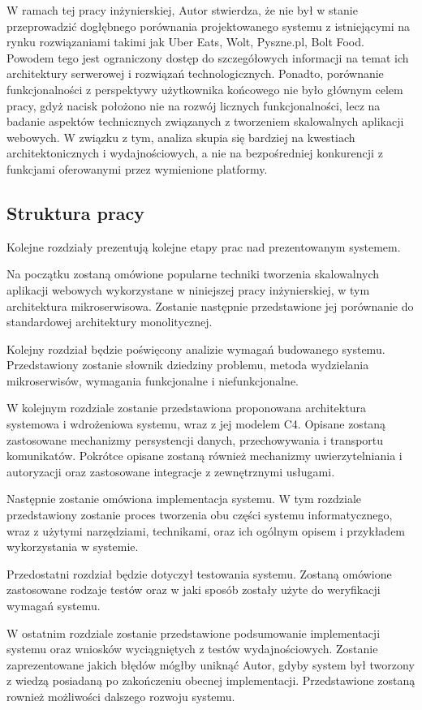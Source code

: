 W ramach tej pracy inżynierskiej, Autor stwierdza, że nie był w stanie przeprowadzić dogłębnego porównania projektowanego systemu z istniejącymi na rynku rozwiązaniami takimi jak Uber Eats, Wolt, Pyszne.pl, Bolt Food. Powodem tego jest ograniczony dostęp do szczegółowych informacji na temat ich architektury serwerowej i rozwiązań technologicznych. Ponadto, porównanie funkcjonalności z perspektywy użytkownika końcowego nie było głównym celem pracy, gdyż nacisk położono nie na rozwój licznych funkcjonalności, lecz na badanie aspektów technicznych związanych z tworzeniem skalowalnych aplikacji webowych. W związku z tym, analiza skupia się bardziej na kwestiach architektonicznych i wydajnościowych, a nie na bezpośredniej konkurencji z funkcjami oferowanymi przez wymienione platformy.


\subsection{Struktura pracy}

Kolejne rozdziały prezentują kolejne etapy prac nad prezentowanym systemem.

Na początku zostaną omówione popularne techniki tworzenia skalowalnych aplikacji webowych wykorzystane w niniejszej pracy inżynierskiej, w tym architektura mikroserwisowa. Zostanie następnie przedstawione jej porównanie do standardowej architektury monolitycznej.

Kolejny rozdział będzie poświęcony analizie wymagań budowanego systemu. Przedstawiony zostanie słownik dziedziny problemu, metoda wydzielania mikroserwisów, wymagania funkcjonalne i niefunkcjonalne.

W kolejnym rozdziale zostanie przedstawiona proponowana architektura systemowa i wdrożeniowa systemu, wraz z jej modelem C4. Opisane zostaną zastosowane mechanizmy persystencji danych, przechowywania i transportu komunikatów. Pokrótce opisane zostaną również mechanizmy uwierzytelniania i autoryzacji oraz zastosowane integracje z zewnętrznymi usługami.

Następnie zostanie omówiona implementacja systemu. W tym rozdziale przedstawiony zostanie proces tworzenia obu części systemu informatycznego, wraz z użytymi narzędziami, technikami, oraz ich ogólnym opisem i przykładem wykorzystania w systemie.

Przedostatni rozdział będzie dotyczył testowania systemu. Zostaną omówione zastosowane rodzaje testów oraz w jaki sposób zostały użyte do weryfikacji wymagań systemu.

W ostatnim rozdziale zostanie przedstawione podsumowanie implementacji systemu oraz wniosków wyciągniętych z testów wydajnościowych. Zostanie zaprezentowane jakich błędów mógłby uniknąć Autor, gdyby system był tworzony z wiedzą posiadaną po zakończeniu obecnej implementacji. Przedstawione zostaną rownież możliwości dalszego rozwoju systemu.